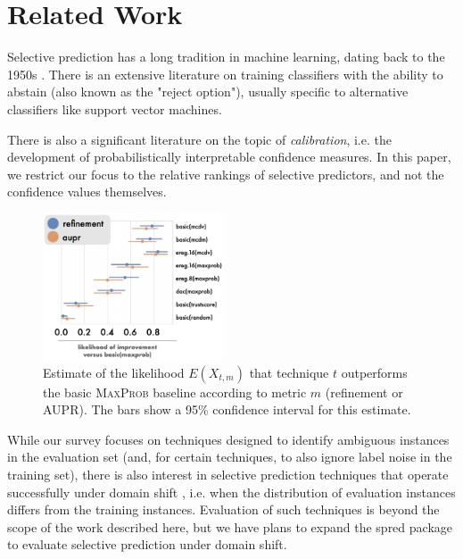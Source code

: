\documentclass[11pt]{article}
\begin{document}
\section{Related Work}

Selective prediction has a long tradition in machine learning, dating back to the  1950s \cite{chow1957optimum}. There is an extensive literature \cite{hellman1970nearest,fumera2002support,cortes2016learning} on training classifiers with the ability to abstain (also known as the "reject option"), usually specific to alternative classifiers like support vector machines.

There is also a significant literature \cite{platt1999probabilistic,guo2017calibration,kumar2018trainable,wang-etal-2020-inference,desai-durrett-2020-calibration} on the topic of \emph{calibration}, i.e. the development of probabilistically interpretable confidence measures. In this paper, we restrict our focus to the relative rankings of selective predictors, and not the confidence values themselves. 

\begin{figure}[tb]
\centering
\includegraphics[width=0.48\textwidth]{pointplot2.png}
\caption{Estimate of the likelihood $E(X_{t,m})$ that technique $t$ outperforms the basic \textsc{MaxProb} baseline according to metric $m$ (refinement or \textsc{AUPR}). The bars show a 95\% confidence interval for this estimate.}\label{fig:auprpointplot}
\end{figure}

While our survey focuses on techniques designed to identify ambiguous instances in the evaluation set (and, for certain techniques, to also ignore label noise in the training set), there is also interest in selective prediction techniques that operate successfully under domain shift \cite{kamath-etal-2020-selective,liu2020energy, Wang_2022_CVPR}, i.e. when the distribution of evaluation instances differs from the training instances. Evaluation of such techniques is beyond the scope of the work described here, but we have plans to expand the \textsf{spred} package to evaluate selective prediction under domain shift.
\end{document}

